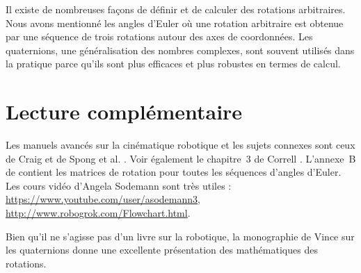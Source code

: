Il existe de nombreuses façons de définir et de calculer des rotations arbitraires. Nous avons mentionné les angles d'Euler où une rotation arbitraire est obtenue par une séquence de trois rotations autour des axes de coordonnées. Les quaternions, une généralisation des nombres complexes, sont souvent utilisés dans la pratique parce qu'ils sont plus efficaces et plus robustes en termes de calcul.

\section{Lecture complémentaire}

Les manuels avancés sur la cinématique robotique et les sujets connexes sont ceux de Craig \cite{craig} et de Spong et al. \cite{spong}. Voir également le chapitre~3 de Correll \cite{correll}. L'annexe~B de \cite{craig} contient les matrices de rotation pour toutes les séquences d'angles d'Euler. Les cours vidéo d'Angela Sodemann sont très utiles :\\
\url{https://www.youtube.com/user/asodemann3},\\
\url{http://www.robogrok.com/Flowchart.html}.

Bien qu'il ne s'agisse pas d'un livre sur la robotique, la monographie de Vince sur les quaternions \cite{vince} donne une excellente présentation des mathématiques des rotations.
